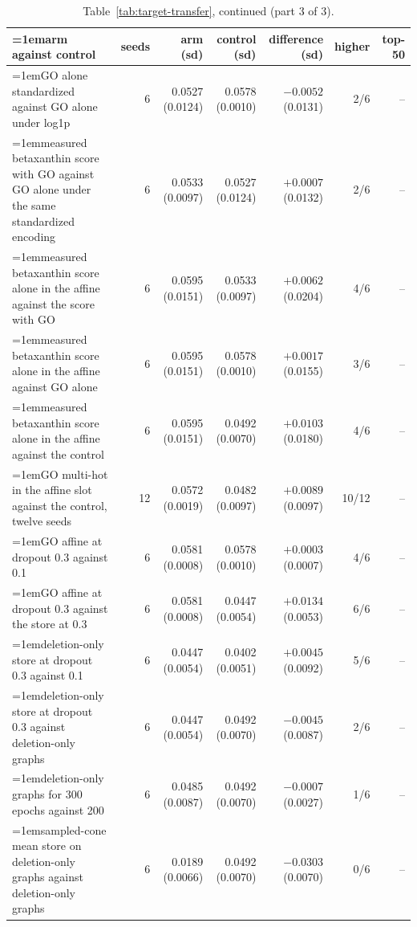 \begin{table}[H]
  \centering
  \footnotesize
  \setlength{\tabcolsep}{2.5pt}
  \caption[The rounds on amino acids: arm against control, continued]{Table~\ref{tab:target-transfer}, continued (part 3 of 3).}
  \label{tab:target-transfer-3}
  \begin{tabular}{@{}>{\raggedright\hangindent=1em\hangafter=1\arraybackslash}p{84.3mm}rrrrrr@{}}
    \hline
    arm against control & seeds & arm (sd) & control (sd) & difference (sd) & higher & top-50 \\
    \hline
    GO alone standardized against GO alone under log1p & 6 & 0.0527 (0.0124) & 0.0578 (0.0010) & $-0.0052$ (0.0131) & 2/6 & -- \\
    measured betaxanthin score with GO against GO alone under the same standardized encoding & 6 & 0.0533 (0.0097) & 0.0527 (0.0124) & $+0.0007$ (0.0132) & 2/6 & -- \\
    measured betaxanthin score alone in the affine against the score with GO & 6 & 0.0595 (0.0151) & 0.0533 (0.0097) & $+0.0062$ (0.0204) & 4/6 & -- \\
    measured betaxanthin score alone in the affine against GO alone & 6 & 0.0595 (0.0151) & 0.0578 (0.0010) & $+0.0017$ (0.0155) & 3/6 & -- \\
    measured betaxanthin score alone in the affine against the control & 6 & 0.0595 (0.0151) & 0.0492 (0.0070) & $+0.0103$ (0.0180) & 4/6 & -- \\
    GO multi-hot in the affine slot against the control, twelve seeds & 12 & 0.0572 (0.0019) & 0.0482 (0.0097) & $+0.0089$ (0.0097) & 10/12 & -- \\
    GO affine at dropout 0.3 against 0.1 & 6 & 0.0581 (0.0008) & 0.0578 (0.0010) & $+0.0003$ (0.0007) & 4/6 & -- \\
    GO affine at dropout 0.3 against the store at 0.3 & 6 & 0.0581 (0.0008) & 0.0447 (0.0054) & $+0.0134$ (0.0053) & 6/6 & -- \\
    deletion-only store at dropout 0.3 against 0.1 & 6 & 0.0447 (0.0054) & 0.0402 (0.0051) & $+0.0045$ (0.0092) & 5/6 & -- \\
    deletion-only store at dropout 0.3 against deletion-only graphs & 6 & 0.0447 (0.0054) & 0.0492 (0.0070) & $-0.0045$ (0.0087) & 2/6 & -- \\
    deletion-only graphs for 300 epochs against 200 & 6 & 0.0485 (0.0087) & 0.0492 (0.0070) & $-0.0007$ (0.0027) & 1/6 & -- \\
    sampled-cone mean store on deletion-only graphs against deletion-only graphs & 6 & 0.0189 (0.0066) & 0.0492 (0.0070) & $-0.0303$ (0.0070) & 0/6 & -- \\

\end{tabular}
\end{table}
